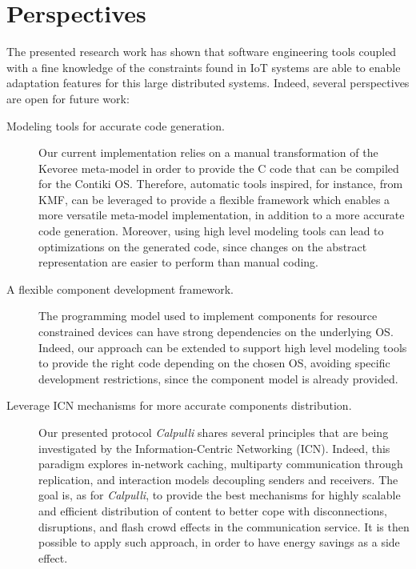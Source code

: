 \chapter{Perspectives}
\label{sec:Perspectives}
The presented research work has shown that software engineering tools coupled with a fine knowledge of the constraints found in IoT systems are able to enable adaptation features for this large distributed systems.
Indeed, several perspectives are open for future work:

\begin{description}
	\item[Modeling tools for accurate code generation.] Our current implementation relies on a manual transformation of the Kevoree meta-model in order to provide the C code that can be compiled for the Contiki OS.
	Therefore, automatic tools inspired, for instance, from KMF\cite{fouquet2012eclipse}, can be leveraged to provide a flexible framework which enables a more versatile meta-model implementation, in addition to a more accurate code generation.
	Moreover, using high level modeling tools can lead to optimizations on the generated code, since changes on the abstract representation are easier to perform than manual coding.
	\item[A flexible component development framework.] The programming model used to implement components for resource constrained devices can have strong dependencies on the underlying OS.
	Indeed, our approach can be extended to support high level modeling tools to provide the right code depending on the chosen OS, avoiding specific development restrictions, since the component model is already provided.
	\item[Leverage ICN mechanisms for more accurate components distribution.] Our presented protocol \textit{Calpulli} shares several principles that are being investigated by the Information-Centric Networking (ICN)\cite{ahlgren2012survey}.
	Indeed, this paradigm explores in-network caching, multiparty communication through replication, and interaction models decoupling senders and	receivers.
	The goal is, as for \textit{Calpulli}, to provide the best mechanisms for highly scalable and	efficient distribution of content to better cope with disconnections, disruptions, and flash crowd effects in the communication service.
	It is then possible to apply such approach, in order to have energy savings as a side effect. 
\end{description}

